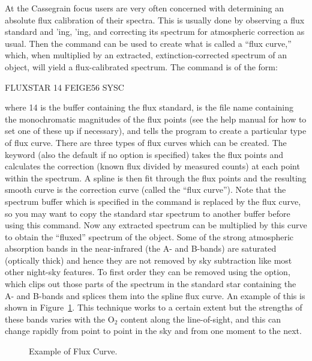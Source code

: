 At the Cassegrain focus users are very often concerned with determining an
absolute flux calibration of their spectra.  This is usually done by observing
a flux standard and 'ing, 'ing, and correcting its
spectrum for atmospheric correction as usual.  Then the command
 can be used to create what is called a ``flux curve,'' which,
when multiplied by an extracted, extinction-corrected spectrum of an object,
will yield a flux-calibrated spectrum.  The  command is of the
form:
\begin{command}
   \item FLUXSTAR 14 FEIGE56 SYSC
\end{command}
\noindent
where 14 is the buffer containing the flux standard,  is the
file name containing the monochromatic magnitudes of the flux points (see the
help manual for how to set one of these up if necessary), and 
tells the program to create a particular type of flux curve.  There are three
types of flux curves which can be created.  The  keyword (also the
default if no option is specified) takes the flux points and calculates the
correction (known flux divided by measured counts) at each point within the
spectrum.  A spline is then fit through the flux points and the resulting
smooth curve is the correction curve (called the ``flux curve'').  Note that
the spectrum buffer which is specified in the  command is
replaced by the flux curve, so you may want to copy the standard star spectrum
to another buffer before using this command.  Now any extracted spectrum can
be multiplied by this curve to obtain the ``fluxed'' spectrum of the object.
Some of the strong atmospheric absorption bands in the near-infrared (the A-
and B-bands) are saturated (optically thick) and hence they are not removed by
sky subtraction like most other night-sky features.  To first order they can
be removed using the  option, which clips out those parts of the
spectrum in the standard star containing the A- and B-bands and splices them
into the spline flux curve.  An example of this is shown in
Figure~\ref{fig:fluxcal}.   This technique works to a certain extent but the
strengths of these bands varies with the O$_2$ content along the
line-of-sight, and this can change rapidly from point to point in the sky and
from one moment to the next.

\begin{figure}[t]
   \centering
   \vspace{4.0in}
   \caption[]{\label{fig:fluxcal} Example of Flux Curve.}
\end{figure}

